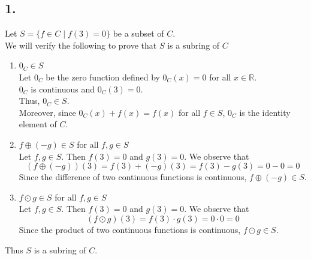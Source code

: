 \documentclass[11pt, a4paper]{article}
\begin{document}
\subsection*{1.}
Let $S = \{f \in C \mid f(3)=0\}$ be a subset of $C$.\\
We will verify the following to prove that $S$ is a subring of $C$
\begin{enumerate}
    \item $0_C \in S$\\
    Let $0_C$ be the zero function defined by $0_C(x) = 0$ for all $x \in \mathbb{R}$.\\
    $0_C$ is continuous and $0_C(3) = 0$.\\
    Thus, $0_C \in S$.\\
    Moreover, since $0_C(x) + f(x) = f(x)$ for all $f \in S$, $0_C$ is the identity element of $C$.
    
    \item $f \oplus (-g) \in S$ for all $f,g \in S$\\
    Let $f, g \in S$. Then $f(3) = 0$ and $g(3) = 0$. 
    We observe that
    $$(f \oplus (-g))(3) = f(3) + (-g)(3) = f(3) - g(3) = 0 - 0 = 0$$
    Since the difference of two continuous functions is continuous, $f \oplus (-g) \in S$.
    
    \item $f \odot g \in S$ for all $f,g \in S$\\
    Let $f, g \in S$. Then $f(3) = 0$ and $g(3) = 0$.
    We observe that
    $$(f \odot g)(3) = f(3)\cdot g(3) = 0 \cdot 0 = 0$$
    Since the product of two continuous functions is continuous, $f \odot g \in S$.
\end{enumerate}
Thus $S$ is a subring of $C$.
\end{document}
